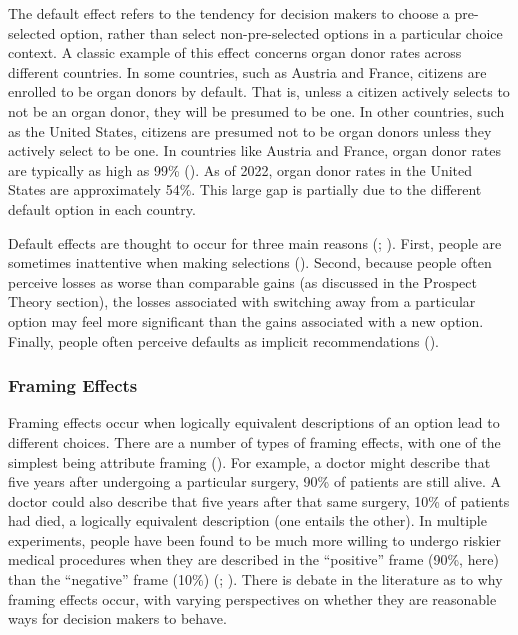 \documentclass[
]{krantz}
\begin{document}
The default effect refers to the tendency for decision makers to choose a pre-selected option, rather than select non-pre-selected options in a particular choice context. A classic example of this effect concerns organ donor rates across different countries. In some countries, such as Austria and France, citizens are enrolled to be organ donors by default. That is, unless a citizen actively selects to not be an organ donor, they will be presumed to be one. In other countries, such as the United States, citizens are presumed not to be organ donors unless they actively select to be one. In countries like Austria and France, organ donor rates are typically as high as 99\% (). As of 2022, organ donor rates in the United States are approximately 54\%. This large gap is partially due to the different default option in each country.

Default effects are thought to occur for three main reasons (; ). First, people are sometimes inattentive when making selections (). Second, because people often perceive losses as worse than comparable gains (as discussed in the Prospect Theory section), the losses associated with switching away from a particular option may feel more significant than the gains associated with a new option. Finally, people often perceive defaults as implicit recommendations ().

\subsubsection*{Framing Effects}\label{framing-effects}


Framing effects occur when logically equivalent descriptions of an option lead to different choices. There are a number of types of framing effects, with one of the simplest being attribute framing (). For example, a doctor might describe that five years after undergoing a particular surgery, 90\% of patients are still alive. A doctor could also describe that five years after that same surgery, 10\% of patients had died, a logically equivalent description (one entails the other). In multiple experiments, people have been found to be much more willing to undergo riskier medical procedures when they are described in the ``positive'' frame (90\%, here) than the ``negative'' frame (10\%) (; ). There is debate in the literature as to why framing effects occur, with varying perspectives on whether they are reasonable ways for decision makers to behave.
\end{document}
